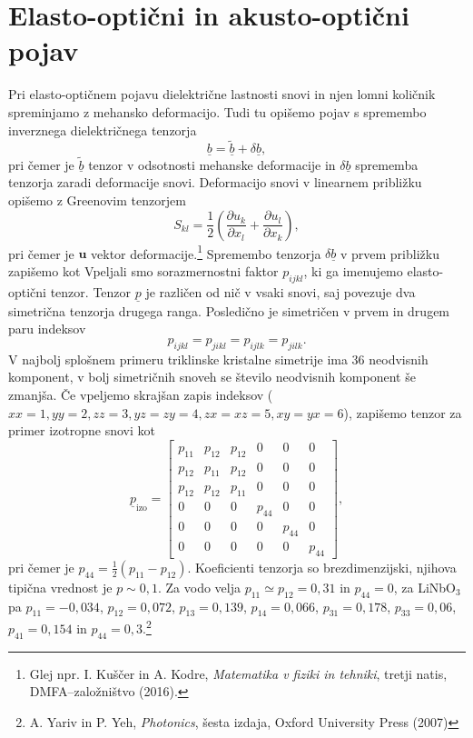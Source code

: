 \section{Elasto-optični in akusto-optični pojav}
Pri elasto-optičnem pojavu dielektrične lastnosti snovi in njen lomni količnik
spreminjamo z mehansko deformacijo. Tudi tu opišemo pojav
s spremembo inverznega dielektričnega tenzorja
\begin{equation}
\underline{b} = \underline{\tilde{b}}+ \delta\underline{b},
\end{equation}
pri čemer je $\underline{\tilde{b}}$ tenzor v odsotnosti mehanske deformacije in
$\delta\underline{b}$ sprememba tenzorja zaradi deformacije snovi. Deformacijo
snovi v linearnem približku opišemo z Greenovim tenzorjem
\begin{equation}
S_{kl}=\frac{1}{2}\left({\frac{\partial u_{k}}{\partial x_{l}}}+
{\frac{\partial u_{l}}{\partial x_{k}}}\right),
\label{7.28}
\end{equation}
pri čemer je $\mathbf{u}$ vektor deformacije.\footnote{Glej npr. I. Kuščer in A. Kodre,  
{\it Matematika v fiziki in tehniki}, tretji natis, DMFA--založništvo (2016).} Spremembo tenzorja
$\delta\underline{b}$ v prvem približku zapišemo kot 
Vpeljali smo sorazmernostni faktor
$p_{ijkl}$, ki ga imenujemo elasto-optični tenzor. 
Tenzor $\underline{p}$ je različen od nič v vsaki snovi, saj povezuje dva simetrična tenzorja 
drugega ranga. Posledično je simetričen v prvem in drugem paru indeksov
\begin{equation}
p_{ijkl} = p_{jikl} = p_{ijlk} =p_{jilk}.
\end{equation}
V najbolj splošnem primeru triklinske kristalne simetrije 
ima 36 neodvisnih komponent, v bolj simetričnih snoveh se število 
neodvisnih komponent še zmanjša. Če vpeljemo skrajšan zapis indeksov ($xx = 1,
yy=2, zz = 3, yz = zy = 4, zx = xz = 5, xy = yx = 6$), zapišemo tenzor za primer izotropne snovi kot
\begin{equation}
\underline{p}_{\textrm{izo}} = 
\left[\begin{array}{cccccc}
p_{11} & p_{12}& p_{12}&0&0&0\\
p_{12} & p_{11}& p_{12}&0&0&0\\
p_{12} & p_{12}& p_{11}&0&0&0\\
0 & 0& 0&p_{44}&0&0\\
0 & 0& 0&0&p_{44}&0\\
0 & 0& 0&0&0&p_{44}
\end{array}\right],
\label{tenzorp}
\end{equation}
pri čemer je $p_{44}= \frac{1}{2}(p_{11}-p_{12})$. Koeficienti tenzorja so 
brezdimenzijski, njihova tipična vrednost je $p\sim0,1$. Za vodo 
velja $p_{11} \simeq p_{12} = 0,31$ in $p_{44} = 0$, za LiNbO$_3$ pa $p_{11} = -0,034$, 
$p_{12} = 0,072$, $p_{13} = 0,139$, $p_{14} = 0,066$, $p_{31} = 0,178$, $p_{33} = 0,06$,
$p_{41} = 0,154$ in $p_{44} = 0,3$.\footnote{A. Yariv in 
P. Yeh, {\it Photonics}, šesta izdaja, Oxford University Press (2007)}

